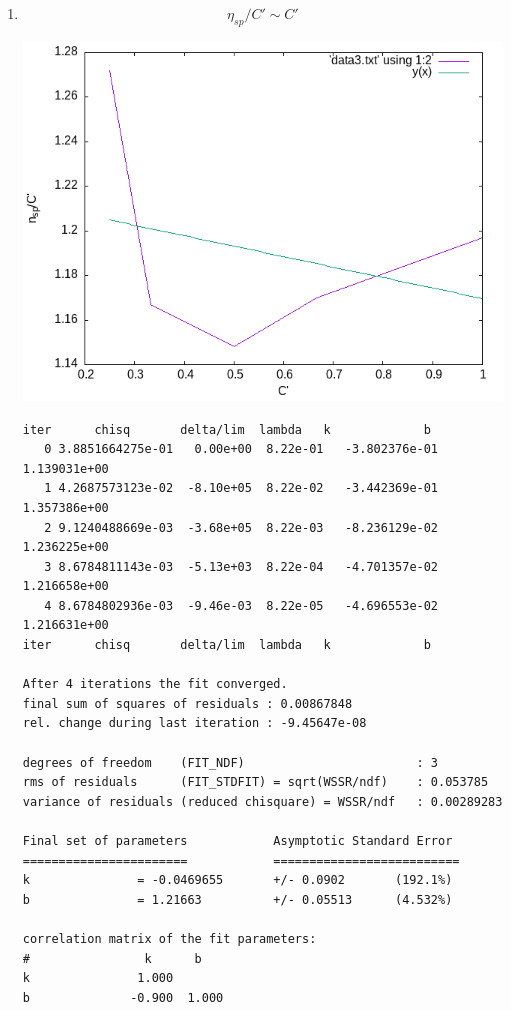 \documentclass[11pt]{report}
\begin{document}
\begin{enumerate}
\item 
\label{sec:org92b1bd0}
\[
\eta_{sp}/C'\sim C'
\]
\begin{center}
\includegraphics[width=.9\linewidth]{../data/out3.png}
\end{center}
\begin{verbatim}
iter      chisq       delta/lim  lambda   k             b            
   0 3.8851664275e-01   0.00e+00  8.22e-01   -3.802376e-01   1.139031e+00
   1 4.2687573123e-02  -8.10e+05  8.22e-02   -3.442369e-01   1.357386e+00
   2 9.1240488669e-03  -3.68e+05  8.22e-03   -8.236129e-02   1.236225e+00
   3 8.6784811143e-03  -5.13e+03  8.22e-04   -4.701357e-02   1.216658e+00
   4 8.6784802936e-03  -9.46e-03  8.22e-05   -4.696553e-02   1.216631e+00
iter      chisq       delta/lim  lambda   k             b            

After 4 iterations the fit converged.
final sum of squares of residuals : 0.00867848
rel. change during last iteration : -9.45647e-08

degrees of freedom    (FIT_NDF)                        : 3
rms of residuals      (FIT_STDFIT) = sqrt(WSSR/ndf)    : 0.053785
variance of residuals (reduced chisquare) = WSSR/ndf   : 0.00289283

Final set of parameters            Asymptotic Standard Error
=======================            ==========================
k               = -0.0469655       +/- 0.0902       (192.1%)
b               = 1.21663          +/- 0.05513      (4.532%)

correlation matrix of the fit parameters:
#                k      b      
k               1.000 
b              -0.900  1.000 


\end{verbatim}
\end{enumerate}
\end{document}
